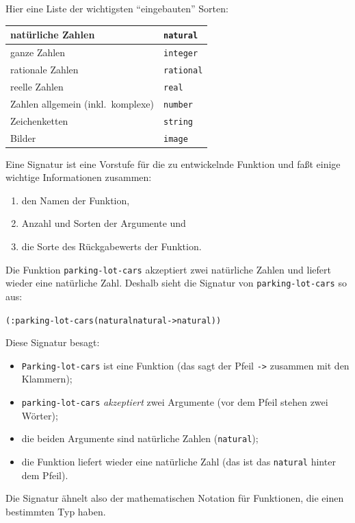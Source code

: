 Hier eine Liste der wichtigsten "`eingebauten"' Sorten:
%
\begin{center}
  \begin{tabular}{l|l}
    natürliche Zahlen & \texttt{natural}\\\hline
    ganze Zahlen & \texttt{integer}\\\hline
    rationale Zahlen & \texttt{rational}\\\hline
    reelle Zahlen & \texttt{real}\\\hline
    Zahlen allgemein (inkl.\ komplexe) & \texttt{number}\\\hline
    Zeichenketten & \texttt{string}\\\hline
    Bilder & \texttt{image}
  \end{tabular}
\end{center}
%
Eine Signatur
ist eine Vorstufe für die zu entwickelnde Funktion und faßt einige
wichtige Informationen zusammen:
%
\begin{enumerate}
\item den Namen der Funktion,
\item Anzahl und Sorten der Argumente und
\item die Sorte des Rückgabewerts der Funktion.
\end{enumerate}
%
Die Funktion
\texttt{parking-lot-cars} akzeptiert zwei natürliche Zahlen und
liefert wieder eine natürliche Zahl.  Deshalb sieht die Signatur von
\texttt{parking-lot-cars} so aus:
%
\begin{alltt}
(: parking-lot-cars (natural natural -> natural))
\end{alltt}
%
Diese Signatur besagt:
%
\begin{itemize}
\item \texttt{Parking-lot-cars} ist eine Funktion (das sagt der Pfeil
  \verb|->| zusammen mit den Klammern);
\item \texttt{parking-lot-cars}
  \textit{akzeptiert} zwei Argumente (vor dem Pfeil
stehen zwei Wörter);
\item die beiden Argumente sind natürliche Zahlen (\texttt{natural});
\item die Funktion liefert wieder eine natürliche Zahl (das ist
das \texttt{natural} hinter dem Pfeil).
\end{itemize}
%
Die Signatur ähnelt also der mathematischen Notation für Funktionen,
die einen bestimmten Typ haben.

